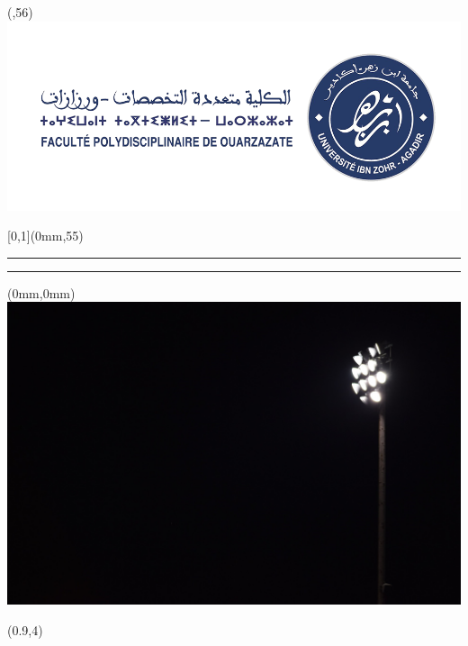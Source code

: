 \begin{frame}[plain]
  \begin{textblock*}{\bandeorwidth}(\banderougewidth,56\TPVertModule) %
    \includegraphics[height=\logoheight,keepaspectratio=true]{img/fpo_logo.png}
  \end{textblock*}
  
  \begin{textblock*}{\paperwidth}[0,1](0mm,55\TPVertModule) %
    \textcolor{ulgray_red}{\rule{\banderougewidth}{\banderougeheight}}%
    \textcolor{ulgray_gold}{\rule{\bandeorwidth}{\bandeorheight}}           %
  \end{textblock*}

  

  \begin{textblock*}{\paperwidth}(0mm,0mm)
    \includegraphics[height=\imageheight,width=\paperwidth]{img/fond_lumiere_stade.jpg}
  \end{textblock*}

  \begin{textblock*}{\banderougewidth}(0.9\TPHorizModule,4\TPVertModule)


\end{textblock*}
\end{frame}

